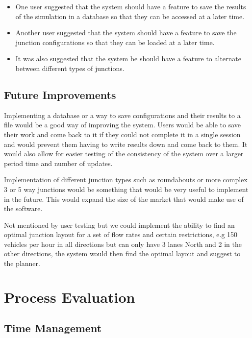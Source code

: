 \documentclass{article}
\begin{document}
    \begin{itemize}
        \item One user suggested that the system should have a feature to save the results of the simulation in a database so that they can be accessed at a later time.
        \item Another user suggested that the system should have a feature to save the junction configurations so that they can be loaded at a later time.
        \item It was also suggested that the system be should have a feature to alternate between different types of junctions.
    \end{itemize}

    \subsection{Future Improvements}

    Implementing a database or a way to save configurations and their results to a file would be a good way of improving
    the system. Users would be able to save their work and come back to it if they could not complete it in a single
    session and would prevent them having to write results down and come back to them. It would also allow for easier
    testing of the consistency of the system over a larger period time and number of updates.

    Implementation of different junction types such as roundabouts or more complex 3 or 5 way junctions would be something
    that would be very useful to implement in the future. This would expand the size of the market that would make use
    of the software.

    Not mentioned by user testing but we could implement the ability to find an optimal junction layout for a set of
    flow rates and certain restrictions, e.g 150 vehicles per hour in all directions but can only have 3 lanes North and
    2 in the other directions, the system would then find the optimal layout and suggest to the planner.


    \section{Process Evaluation}

    \subsection{Time Management}
\end{document}
